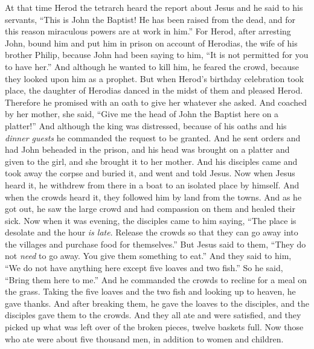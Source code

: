 \begin{biblechapter} %
 At that time Herod the tetrarch heard the report about Jesus
\verse and he said to his servants, “This is John the Baptist! He has been raised from the dead, and for this reason miraculous powers are at work in him.”
\verse For Herod, after arresting John, bound him and put him in prison on account of Herodias, the wife of his brother Philip,
\verse because John had been saying to him, “It is not permitted for you to have her.”
\verse And although he wanted to kill him, he feared the crowd, because they looked upon him as a prophet.
\verse But when Herod’s birthday celebration took place, the daughter of Herodias danced in the midst of them and pleased Herod.
\verse Therefore he promised with an oath to give her whatever she asked.
\verse And coached by her mother, she said, “Give me the head of John the Baptist here on a platter!”
\verse And although the king was distressed, because of his oaths and his \textit{dinner guests} he commanded the request to be granted.
\verse And he sent orders and had John beheaded in the prison,
\verse and his head was brought on a platter and given to the girl, and she brought it to her mother.
\verse And his disciples came and took away the corpse and buried it, and went and told Jesus.
 Now when Jesus heard it, he withdrew from there in a boat to an isolated place by himself. And when the crowds heard it, they followed him by land from the towns.
\verse And as he got out, he saw the large crowd and had compassion on them and healed their sick.
\verse Now when it was evening, the disciples came to him saying, “The place is desolate and the hour \textit{is late}. Release the crowds so that they can go away into the villages and purchase food for themselves.”
\verse But Jesus said to them, “They do not \textit{need} to go away. You give them something to eat.”
\verse And they said to him, “We do not have anything here except five loaves and two fish.”
\verse So he said, “Bring them here to me.”
\verse And he commanded the crowds to recline for a meal on the grass. Taking the five loaves and the two fish and looking up to heaven, he gave thanks. And after breaking them, he gave the loaves to the disciples, and the disciples gave them to the crowds.
\verse And they all ate and were satisfied, and they picked up what was left over of the broken pieces, twelve baskets full.
\verse Now those who ate were about five thousand men, in addition to women and children.

\end{biblechapter}
